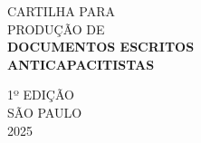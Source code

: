 \vspace*{\fill}

\begin{minipage}{0.3\textwidth}
    \hfill
\end{minipage}%
\begin{minipage}{0.7\textwidth}
\begin{flushleft}
\fininha           %
\LARGE             %
\color{crp2}       %
CARTILHA PARA\\    %
PRODUÇÃO DE\\      %

\media             %
\color{crp1}       %
\textbf{DOCUMENTOS ESCRITOS\\    %
ANTICAPACITISTAS}  %

\vspace*{2\baselineskip}  %

\color{crp3}       %
\Light             %
\normalsize        %

1º EDIÇÃO\\        %
SÃO PAULO\\        %
2025               %

\end{flushleft}    %
\end{minipage}     %

